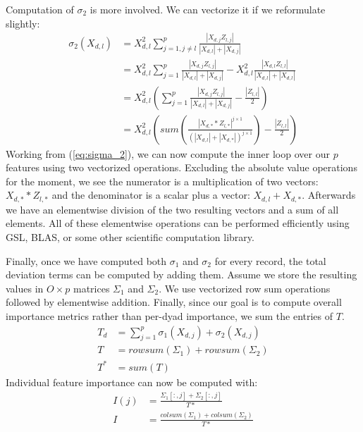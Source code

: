 \documentclass[10pt]{journal}
\begin{document}
Computation of $\sigma_2$ is more involved. We can vectorize it if we
reformulate slightly:
%
\begin{align}
    \sigma_2(X_{d,l})
        &= X_{d,l}^2 \sum_{j=1, j \neq l}^p
            \frac{|X_{d,j} Z_{l,j}|}
                 {|X_{d,l}| + |X_{d,j}|}  \\
        &= X_{d,l}^2 \sum_{j=1}^p
            \frac{|X_{d,j} Z_{l,j}|}
                 {|X_{d,l}| + |X_{d,j}|} -
             X_{d,l}^2 \frac{|X_{d,l} Z_{l,l}|}
                            {|X_{d,l}| + |X_{d,l}|}  \\
        &= X_{d,l}^2 \left(
            \sum_{j=1}^p
                \frac{|X_{d,j} Z_{l,j}|}
                     {|X_{d,l}| + |X_{d,j}|} -
            \frac{|Z_{l,l}|}{2}
        \right) \\
        &= X_{d,l}^2 \left(  \label{eq:sigma_2}
            sum \left(
                \frac{|X_{d,*} * Z_{l,*}|^{j \times 1}}
                {(|X_{d,l}| + |X_{d,*}|)^{j \times 1}}
            \right) - \frac{|Z_{l,l}|}{2}
        \right)
\end{align}
%
Working from (\ref{eq:sigma_2}), we can now compute the inner loop over our $p$
features using two vectorized operations. Excluding the absolute value
operations for the moment, we see the numerator is a multiplication of
two vectors: $X_{d,*} * Z_{l, *}$ and the denominator is a scalar plus a vector:
$X_{d,l} + X_{d,*}$. Afterwards we have an elementwise division of the two
resulting vectors and a sum of all elements. All of these elementwise operations
can be performed efficiently using GSL, BLAS, or some other scientific
computation library.

Finally, once we have computed both $\sigma_1$ and $\sigma_2$ for every record,
the total deviation terms can be computed by adding them. Assume we store the
resulting values in $O \times p$ matrices $\Sigma_1$ and $\Sigma_2$. We use
vectorized row sum operations followed by elementwise addition. Finally, since
our goal is to compute overall importance metrics rather than per-dyad
importance, we sum the entries of $T$.
%
\begin{align}
    T_d &= \sum_{j=1}^p \sigma_1(X_{d,j}) + \sigma_2(X_{d,j})  \\[3mm]
    T   &= rowsum(\Sigma_1) + rowsum(\Sigma_2)  \\[3mm]
    T^* &= sum(T)
\end{align}
%
Individual feature importance can now be computed with:
%
\begin{align}
    I(j) &= \frac{\Sigma_1[:, j] + \Sigma_2[:, j]}{T*}  \\[3mm]
    I    &= \frac{colsum(\Sigma_1) + colsum(\Sigma_2)}{T*}
\end{align}
%
\end{document}
